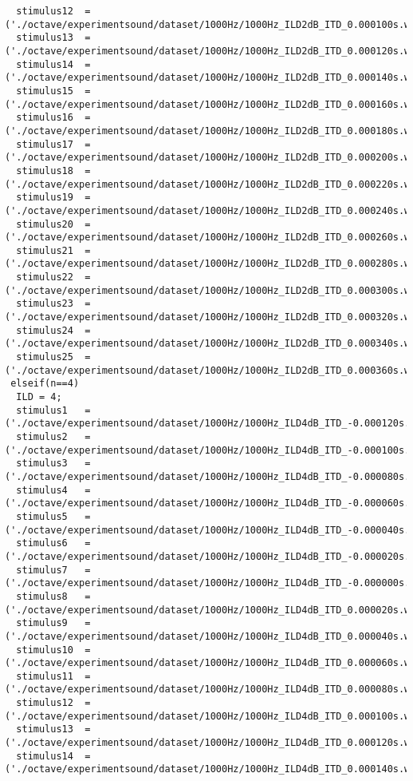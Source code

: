 {\begin{verbatim}
  stimulus12  =('./octave/experimentsound/dataset/1000Hz/1000Hz_ILD2dB_ITD_0.000100s.wav');
  stimulus13  =('./octave/experimentsound/dataset/1000Hz/1000Hz_ILD2dB_ITD_0.000120s.wav');
  stimulus14  =('./octave/experimentsound/dataset/1000Hz/1000Hz_ILD2dB_ITD_0.000140s.wav');
  stimulus15  =('./octave/experimentsound/dataset/1000Hz/1000Hz_ILD2dB_ITD_0.000160s.wav');
  stimulus16  =('./octave/experimentsound/dataset/1000Hz/1000Hz_ILD2dB_ITD_0.000180s.wav');
  stimulus17  =('./octave/experimentsound/dataset/1000Hz/1000Hz_ILD2dB_ITD_0.000200s.wav');
  stimulus18  =('./octave/experimentsound/dataset/1000Hz/1000Hz_ILD2dB_ITD_0.000220s.wav');
  stimulus19  =('./octave/experimentsound/dataset/1000Hz/1000Hz_ILD2dB_ITD_0.000240s.wav');
  stimulus20  =('./octave/experimentsound/dataset/1000Hz/1000Hz_ILD2dB_ITD_0.000260s.wav');
  stimulus21  =('./octave/experimentsound/dataset/1000Hz/1000Hz_ILD2dB_ITD_0.000280s.wav');
  stimulus22  =('./octave/experimentsound/dataset/1000Hz/1000Hz_ILD2dB_ITD_0.000300s.wav');
  stimulus23  =('./octave/experimentsound/dataset/1000Hz/1000Hz_ILD2dB_ITD_0.000320s.wav');
  stimulus24  =('./octave/experimentsound/dataset/1000Hz/1000Hz_ILD2dB_ITD_0.000340s.wav');
  stimulus25  =('./octave/experimentsound/dataset/1000Hz/1000Hz_ILD2dB_ITD_0.000360s.wav');
 elseif(n==4)
  ILD = 4;
  stimulus1   =('./octave/experimentsound/dataset/1000Hz/1000Hz_ILD4dB_ITD_-0.000120s.wav');
  stimulus2   =('./octave/experimentsound/dataset/1000Hz/1000Hz_ILD4dB_ITD_-0.000100s.wav');
  stimulus3   =('./octave/experimentsound/dataset/1000Hz/1000Hz_ILD4dB_ITD_-0.000080s.wav');
  stimulus4   =('./octave/experimentsound/dataset/1000Hz/1000Hz_ILD4dB_ITD_-0.000060s.wav');
  stimulus5   =('./octave/experimentsound/dataset/1000Hz/1000Hz_ILD4dB_ITD_-0.000040s.wav');
  stimulus6   =('./octave/experimentsound/dataset/1000Hz/1000Hz_ILD4dB_ITD_-0.000020s.wav');
  stimulus7   =('./octave/experimentsound/dataset/1000Hz/1000Hz_ILD4dB_ITD_-0.000000s.wav');
  stimulus8   =('./octave/experimentsound/dataset/1000Hz/1000Hz_ILD4dB_ITD_0.000020s.wav');
  stimulus9   =('./octave/experimentsound/dataset/1000Hz/1000Hz_ILD4dB_ITD_0.000040s.wav');
  stimulus10  =('./octave/experimentsound/dataset/1000Hz/1000Hz_ILD4dB_ITD_0.000060s.wav');
  stimulus11  =('./octave/experimentsound/dataset/1000Hz/1000Hz_ILD4dB_ITD_0.000080s.wav');
  stimulus12  =('./octave/experimentsound/dataset/1000Hz/1000Hz_ILD4dB_ITD_0.000100s.wav');
  stimulus13  =('./octave/experimentsound/dataset/1000Hz/1000Hz_ILD4dB_ITD_0.000120s.wav');
  stimulus14  =('./octave/experimentsound/dataset/1000Hz/1000Hz_ILD4dB_ITD_0.000140s.wav');

\end{verbatim}}
